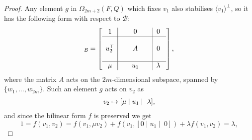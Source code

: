 \begin{proof}
	Any element $g$ in $\Omega_{2m+2}(F,Q)$ which fixes $v_1$ also stabilises
    $\langle v_1 \rangle^{\perp}$, so it has the
    following form with respect to $\mathcal{B}$:
    \begin{equation*}
	[g]_{\mathcal{B}}=\left[
	    \begin{array}{c|c|c}
		1 & 0 & 0\  \\ \hline 
		 & & \\
		u_2^\T &\ \ \ \ \ A\ \ \ \ \  & 0\  \\ 
		 & & \\ \hline 
		\mu & u_1 & \lambda\ 
	    \end{array}
	\right],
    \end{equation*}
    where the matrix $A$ acts on the $2m$-dimensional subspace, 
    spanned by $\{w_1, ..., w_{2m}\}$. Such an element $g$ acts on $v_2$ as
    \begin{equation*}
	\begin{array}{r@{\;}c@{\;}l}
		v_2 & \mapsto & [\mu \mid u_1 \mid\ \lambda],
	\end{array}
    \end{equation*}
    and since the bilinear form $f$ is preserved we get
    \begin{equation*}
	1 = f(v_1,v_2) = f(v_1,\mu v_2) + 
	f(v_1, [0 \mid u_1 \mid\ 0] ) + \lambda f(v_1,v_2) = \lambda,
    \end{equation*}
    

\end{proof}
